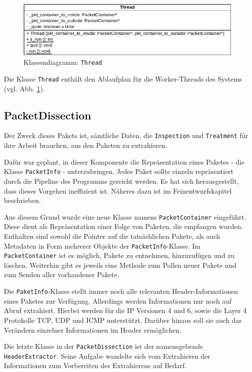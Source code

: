 \documentclass[../review_3.tex]{subfiles}
\begin{document}
\begin{figure}[h]
    \centering
    \includegraphics[width=0.85\linewidth]{img/Thread.pdf}
    \caption{Klassendiagramm: \texttt{Thread}}
    \label{thread}
\end{figure}
Die Klasse \texttt{Thread} enthält den Ablaufplan für die Worker-Threads des Systems (vgl. Abb. \ref{thread}).

\subsection{PacketDissection}
Der  Zweck dieses Pakets ist, sämtliche Daten, die \texttt{Inspection} und \texttt{Treatment} für ihre Arbeit brauchen, aus den Paketen zu extrahieren.

Dafür war geplant, in dieser Komponente die Repräsentation eines Paketes - die Klasse \texttt{PacketInfo} - unterzubringen. Jedes Paket sollte einzeln repräsentiert durch die Pipeline des Programms gereicht werden. Es hat sich herausgestellt, dass dieses Vorgehen ineffizient ist. Näheres dazu ist im Feinentwurfskapitel beschrieben.

Aus diesem Grund wurde eine neue Klasse namens \texttt{PacketContainer} eingeführt. Diese dient als Repräsentation einer Folge von Paketen, die empfangen wurden. Enthalten sind sowohl die Pointer auf die tatsächlichen Pakete, als auch Metadaten in Form mehrerer Objekte der \texttt{PacketInfo}-Klasse. Im \texttt{PacketContainer} ist es möglich, Pakete zu entnehmen, hinzuzufügen und zu löschen. Weiterhin gibt es jeweils eine Methode zum Pollen neuer Pakete und zum Senden aller vorhandener Pakete.

Die \texttt{PaketInfo}-Klasse stellt immer noch alle relevanten Header-Informationen eines Paketes zur Verfügung. Allerdings werden Informationen nur noch auf Abruf extrahiert. Hierbei werden für die IP Versionen 4 und 6, sowie die Layer 4 Protokolle TCP, UDP und ICMP unterstützt. Darüber hinaus soll sie auch das Verändern einzelner Informationen im Header ermöglichen.

Die letzte Klasse in der \texttt{PacketDissection} ist der namensgebende \texttt{HeaderExtractor}. Seine Aufgabe wandelte sich vom Extrahieren der Informationen zum Vorbereiten des Extrahierens auf Bedarf.
\end{document}
